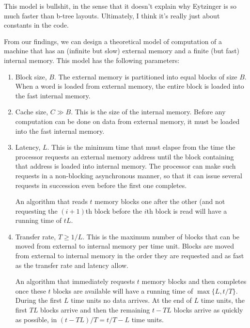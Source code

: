 \documentclass{patmorin}
\begin{document}
This model is bullshit, in the sense that it doesn't explain why Eytzinger
is so much faster than b-tree layouts.  Ultimately, I think it's really just about constants in the code.


From our findings, we can design a theoretical model of computation of
a machine that has an (infinite but slow) external memory and a finite
(but fast) internal memory.  This model has the following parameters:

\begin{enumerate}

  \item Block size, $B$. The external memory is partitioned into equal
    blocks of size $B$. When a word is loaded from external memory,
    the entire block is loaded into the fast internal memory.

  \item Cache size, $C \gg B$.  This is the size of the internal
    memory. Before any computation can be done on data from external
    memory, it must be loaded into the fast internal memory.

  \item Latency, $L$. This is the minimum time that must elapse from the
    time the processor requests an external memory address until the block
    containing that address is loaded into internal memory.  The processor
    can make such requests in a non-blocking asynchronous manner, so that
    it can issue several requests in succession even before the first one
    completes.

    An algorithm that reads $t$ memory blocks one after the other (and
    not requesting the $(i+1)$th block before the $i$th block is read
    will have a running time of $tL$.

  \item Transfer rate, $T \ge 1/L$.  This is the maximum number of
    blocks that can be moved from external to internal memory per time
    unit.  Blocks are moved from external to internal memory in the order
    they are requested and as fast as the transfer rate and latency allow.

    An algorithm that immediately requests $t$ memory blocks and then
    completes once these $t$ blocks are available will have a running
    time of $\max\{L,t/T\}$.  During the first $L$ time units no data
    arrives. At the end of $L$ time units, the first $TL$ blocks arrive
    and then the remaining $t-TL$ blocks arrive as quickly as possible,
    in $(t-TL)/T=t/T -L$ time units.

\end{enumerate}
\end{document}

